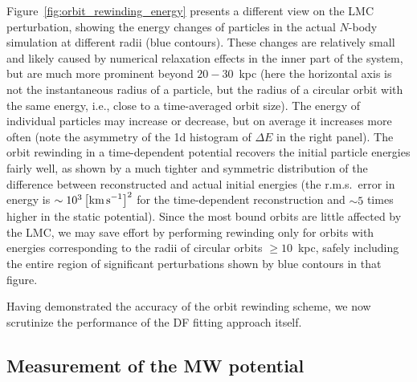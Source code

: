 \documentclass[usenatbib,fleqn]{mnras}
\begin{document}
Figure~\ref{fig:orbit_rewinding_energy} presents a different view on the LMC perturbation, showing the energy changes of particles in the actual $N$-body simulation at different radii (blue contours). These changes are relatively small and likely caused by numerical relaxation effects in the inner part of the system, but are much more prominent beyond $20-30$~kpc (here the horizontal axis is not the instantaneous radius of a particle, but the radius of a circular orbit with the same energy, i.e., close to a time-averaged orbit size). The energy of individual particles may increase or decrease, but on average it increases more often (note the asymmetry of the 1d histogram of $\Delta E$ in the right panel). The orbit rewinding in a time-dependent potential recovers the initial particle energies fairly well, as shown by a much tighter and symmetric distribution of the difference between reconstructed and actual initial energies (the r.m.s.\ error in energy is $\sim 10^3\,\big[\text{km\,s}^{-1}\big]^2$ for the time-dependent reconstruction and $\sim 5$ times higher in the static potential). Since the most bound orbits are little affected by the LMC, we may save effort by performing rewinding only for orbits with energies corresponding to the radii of circular orbits $\ge 10$~kpc, safely including the entire region of significant perturbations shown by blue contours in that figure.

Having demonstrated the accuracy of the orbit rewinding scheme, we now scrutinize the performance of the DF fitting approach itself.

\subsection{Measurement of the MW potential}  \label{sec:test_potential_inference}
\end{document}
